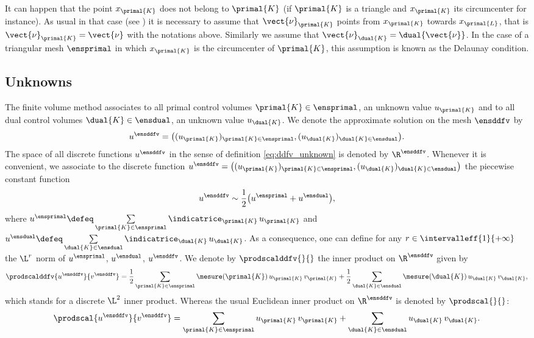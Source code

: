 It can happen that the point $x_{\primal{K}}$ does not belong to $\primal{K}$ (if $\primal{K}$ is a triangle and $x_{\primal{K}}$ its circumcenter for instance). As usual in that case (see \cite{eymard_finite_2000}) it is necessary to assume that $\vect{\nu}_{\primal{K}}$ points from $x_{\primal{K}}$ towards $x_{\primal{L}}$, that is $\vect{\nu}_{\primal{K}} = \vect{\nu}$ with the notations above. Similarly we assume that $\vect{\nu}_{\dual{K}} = \dual{\vect{\nu}}$. In the case of a triangular mesh $\ensprimal$ in which $x_{\primal{K}}$ is the circumcenter of $\primal{K}$, this assumption is known as the Delaunay condition. 

\subsection{Unknowns}

The finite volume method associates to all primal control volumes $\primal{K} \in \ensprimal$, an unknown value $u_{\primal{K}}$ and to all dual control volumes $\dual{K} \in \ensdual$, an unknown value $u_{\dual{K}}$. We denote the approximate solution on the mesh $\ensddfv$ by
\begin{equation} \label{eq:ddfv_unknown}
u^\ensddfv = \big( (u_{\primal{K}})_{\primal{K} \in \ensprimal}, (u_{\dual{K}})_{\dual{K} \in \ensdual} \big).
\end{equation}
The space of all discrete functions $u^\ensddfv$ in the sense of definition \ref{eq:ddfv_unknown} is denoted by $\R^\ensddfv$. Whenever it is convenient, we associate to the discrete function $u^\ensddfv = \big( (u_{\primal{K}})_{\primal{K} \in \ensprimal}, (u_{\dual{K}})_{\dual{K} \in \ensdual} \big)$ the piecewise constant function
\[
u^\ensddfv \sim \frac{1}{2} \big( u^\ensprimal + u^\ensdual \big),
\]
where $u^\ensprimal \defeq \sum\limits_{\primal{K} \in \ensprimal} \indicatrice_{\primal{K}} \, u_{\primal{K}}$ and $u^\ensdual \defeq \sum\limits_{\dual{K} \in \ensdual} \indicatrice_{\dual{K}} \, u_{\dual{K}}$. As a consequence, one can define for any $r \in \intervalleff{1}{+\infty}$ the $\L^r$ norm of $u^\ensprimal$, $u^\ensdual$, $u^\ensddfv$. We denote by $\prodscalddfv{}{}$ the inner product on $\R^\ensddfv$ given by
\[
\prodscalddfv{u^\ensddfv}{v^\ensddfv} = \frac{1}{2} \sum_{\primal{K} \in \ensprimal} \mesure(\primal{K}) \, u_{\primal{K}} \, v_{\primal{K}} + \frac{1}{2} \sum_{\dual{K} \in \ensdual} \mesure(\dual{K}) \, u_{\dual{K}} \, v_{\dual{K}},
\]
which stands for a discrete $\L^2$ inner product. Whereas the usual Euclidean inner product on $\R^\ensddfv$ is denoted by $\prodscal{}{}$:
\[
\prodscal{u^\ensddfv}{v^\ensddfv} = \sum_{\primal{K} \in \ensprimal} u_{\primal{K}} \,  v_{\primal{K}} + \sum_{\dual{K} \in \ensdual} u_{\dual{K}} \, v_{\dual{K}}.
\]

